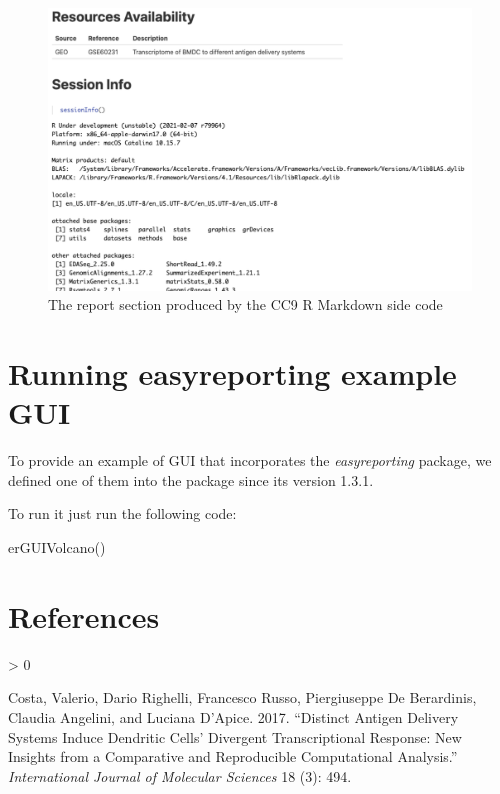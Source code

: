\documentclass[
]{article}
\newenvironment{Shaded}{\begin{snugshade}}{\end{snugshade}}
\newcommand{\FunctionTok}[1]{\textcolor[rgb]{0.00,0.00,0.00}{#1}}
\newcommand{\NormalTok}[1]{#1}
\newlength{\cslhangindent}
\newenvironment{CSLReferences}[2] %
 {%
  \setlength{\parindent}{0pt}
  \ifodd #1 \everypar{\setlength{\hangindent}{\cslhangindent}}\ignorespaces\fi
  \ifnum #2 > 0
  \setlength{\parskip}{#2\baselineskip}
  \fi
 }%
 {}
\begin{document}
\begin{figure}[ht]

{\centering \includegraphics[width=0.95\linewidth]{imgs/9} 

}

\caption{The report section produced by the CC9 R Markdown side code}\label{fig:unnamed-chunk-20}
\end{figure}

\hypertarget{running-easyreporting-example-gui}{%
\section{Running easyreporting example
GUI}\label{running-easyreporting-example-gui}}

To provide an example of GUI that incorporates the \emph{easyreporting}
package, we defined one of them into the package since its version
1.3.1.

To run it just run the following code:

\begin{Shaded}
\begin{Highlighting}[]
\FunctionTok{erGUIVolcano}\NormalTok{()}
\end{Highlighting}
\end{Shaded}

\hypertarget{references}{%
\section*{References}\label{references}}

\hypertarget{refs}{}
\begin{CSLReferences}{1}{0}
\leavevmode\hypertarget{ref-costa2017distinct}{}%
Costa, Valerio, Dario Righelli, Francesco Russo, Piergiuseppe De
Berardinis, Claudia Angelini, and Luciana D'Apice. 2017. {``Distinct
Antigen Delivery Systems Induce Dendritic Cells' Divergent
Transcriptional Response: New Insights from a Comparative and
Reproducible Computational Analysis.''} \emph{International Journal of
Molecular Sciences} 18 (3): 494.

\end{CSLReferences}
\end{document}
